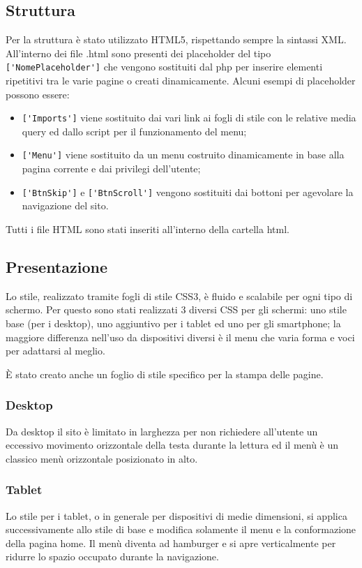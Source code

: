 \subsection{Struttura}
    Per la struttura è stato utilizzato HTML5, rispettando sempre la sintassi XML.
    All'interno dei file .html sono presenti dei placeholder del tipo \verb|['NomePlaceholder']| che vengono sostituiti dal php per inserire elementi ripetitivi tra le varie pagine o creati dinamicamente.
    Alcuni esempi di placeholder possono essere:
    \begin{itemize}
        \item \verb|['Imports']| viene sostituito dai vari link ai fogli di stile con le relative media query ed dallo script per il funzionamento del menu;
        \item \verb|['Menu']| viene sostituito da un menu costruito dinamicamente in base alla pagina corrente e dai privilegi dell'utente;
        \item \verb|['BtnSkip']| e \verb|['BtnScroll']| vengono sostituiti dai bottoni per agevolare la navigazione del sito.
    \end{itemize}
    Tutti i file HTML sono stati inseriti all'interno della cartella html.

\subsection{Presentazione}
Lo stile, realizzato tramite fogli di stile CSS3, è fluido e scalabile per ogni tipo di schermo.
Per questo sono stati realizzati 3 diversi CSS per gli schermi: uno stile base (per i desktop), uno aggiuntivo per i tablet ed uno per gli smartphone;
la maggiore differenza nell'uso da dispositivi diversi è il menu che varia forma e voci per adattarsi al meglio.

È stato creato anche un foglio di stile specifico per la stampa delle pagine.

\subsubsection{Desktop}
Da desktop il sito è limitato in larghezza per non richiedere all'utente un eccessivo movimento orizzontale della testa durante la lettura ed il menù è un classico menù orizzontale posizionato in alto.

\subsubsection{Tablet}
Lo stile per i tablet, o in generale per dispositivi di medie dimensioni, si applica successivamente allo stile di base e modifica solamente il menu e la conformazione della pagina home.
Il menù diventa ad hamburger e si apre verticalmente per ridurre lo spazio occupato durante la navigazione.

